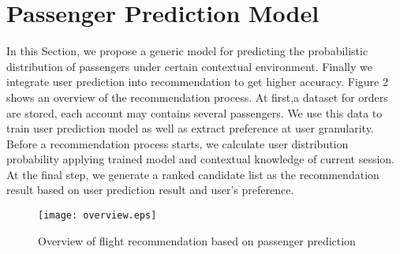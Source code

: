 \documentclass{llncs}
\begin{document}
\section{Passenger Prediction Model}
\label{sec:mod}
In this Section, we propose a generic model for predicting the probabilistic distribution of passengers under certain contextual environment. Finally we integrate user prediction into recommendation to get higher accuracy. Figure 2 shows an overview of the recommendation process. At first,a dataset for orders are stored, each account may contains several passengers. We use this data to train user prediction model as well as extract preference at user granularity. Before a recommendation process starts, we calculate user distribution probability applying trained model and contextual knowledge of current session. At the final step, we generate a ranked candidate list as the recommendation result based on user prediction result and user's preference.\par
\begin{figure}[!hbt]
\centering
\texttt{[image: overview.eps]}
\caption{Overview of flight recommendation based on passenger prediction}
\label{fig:over}
\end{figure}\par
\end{document}
